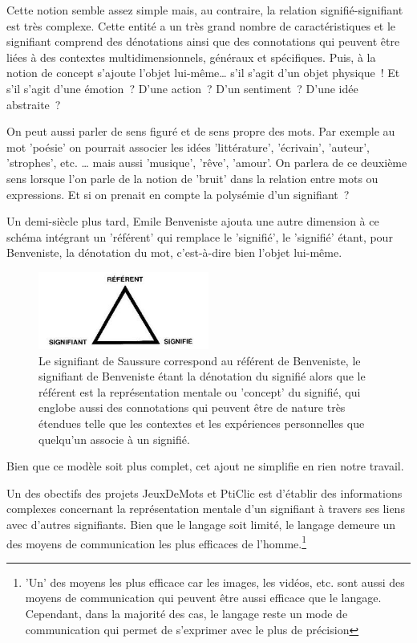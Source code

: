 \documentclass[a4paper,11pt,french]{article}
\begin{document}
Cette notion semble assez simple mais, au contraire, la relation signifié-signifiant est très complexe. Cette entité a un très grand nombre de caractéristiques et le signifiant comprend des dénotations ainsi que des connotations qui peuvent être liées à des contextes multidimensionnels, généraux et spécifiques. Puis, à la notion de concept s'ajoute l'objet lui-même\dots{} s'il s'agit d'un objet physique~! Et s'il s'agit d'une émotion~? D'une action~? D'un sentiment~? D'une idée abstraite~? 

On peut aussi parler de sens figuré et de sens propre des mots. Par exemple au mot 'poésie' on pourrait associer les idées 'littérature', 'écrivain', 'auteur', 'strophes', etc. … mais aussi 'musique', 'rêve', 'amour'. On parlera de ce deuxième sens lorsque l'on parle de la notion de 'bruit' dans la relation entre mots ou expressions. Et si on prenait en compte la polysémie d'un signifiant~?

Un demi-siècle plus tard, Emile Benveniste ajouta une autre dimension à ce schéma intégrant un 'référent' qui remplace le 'signifié', le 'signifié' étant, pour Benveniste, la dénotation du mot, c'est-à-dire bien l'objet lui-même. 

\begin{figure}[h!]
  \centering
      \includegraphics[width=0.5\textwidth]{img/trianglesemiotique.jpeg}
  \caption{Le signifiant de Saussure correspond au référent de Benveniste, le signifiant de Benveniste étant la dénotation du signifié alors que le référent est la représentation mentale ou 'concept' du signifié, qui englobe aussi des connotations qui peuvent être de nature très étendues telle que les contextes et les expériences personnelles que quelqu'un associe à un signifié.}
\end{figure}

Bien que ce modèle soit plus complet, cet ajout ne simplifie en rien notre travail. 

Un des obectifs des projets JeuxDeMots et PtiClic est d'établir des informations complexes concernant la représentation mentale d'un signifiant à travers ses liens avec d'autres signifiants. Bien que le langage soit limité, le langage demeure un des moyens de communication les plus efficaces de l'homme.\footnote{'Un' des moyens les plus efficace car les images, les vidéos, etc. sont aussi des moyens de communication qui peuvent être aussi efficace que le langage. Cependant, dans la majorité des cas, le langage reste un mode de communication qui permet de s'exprimer avec le plus de précision} 
\end{document}
